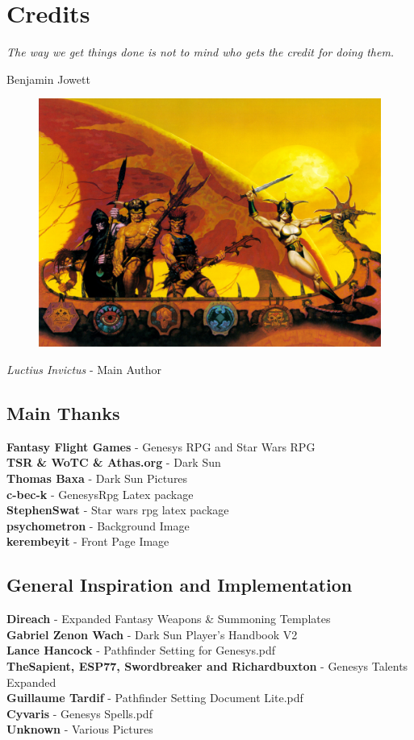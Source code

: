 \chapter{Credits}\label{chap:credits}
\epigraph{\textit{
    The way we get things done is not to mind who gets the credit for doing them.
} }{
    Benjamin Jowett
}

\begin{figure}[H]
\centering
\includegraphics[width=0.4\linewidth]{images/bromdarksun.jpg}
\end{figure}

\begin{centering}
\textit{Luctius Invictus} - Main Author\\
\end{centering}

\section{Main Thanks}
\begin{centering}
\textbf{Fantasy Flight Games} - Genesys RPG and Star Wars RPG\\
\textbf{TSR \& WoTC \& Athas.org} - Dark Sun\\
\textbf{Thomas Baxa} - Dark Sun Pictures\\
\textbf{c-bec-k} - GenesysRpg Latex package\\
\textbf{StephenSwat} - Star wars rpg latex package\\
\textbf{psychometron} - Background Image\\
\textbf{kerembeyit} - Front Page Image\\
\end{centering}

\section{General Inspiration and Implementation}
\begin{centering}
\textbf{Direach} - Expanded Fantasy Weapons \& Summoning Templates\\
\textbf{Gabriel Zenon Wach} - Dark Sun Player's Handbook V2\\
\textbf{Lance Hancock} - Pathfinder Setting for Genesys.pdf\\
\textbf{TheSapient, ESP77, Swordbreaker and Richardbuxton} - Genesys Talents Expanded\\
\textbf{Guillaume Tardif} - Pathfinder Setting Document Lite.pdf\\
\textbf{Cyvaris} - Genesys Spells.pdf\\
\textbf{Unknown} - Various Pictures\\
\end{centering}


